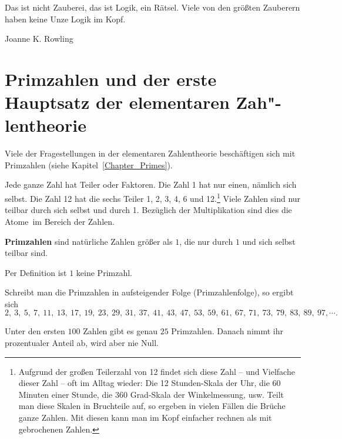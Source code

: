 \begin{refsegment}
\begin{ctsquote}
Das ist nicht Zauberei, das ist Logik, ein Rätsel.
Viele von den größten Zauberern haben keine Unze Logik im Kopf.
\caption[Joanne K. Rowling]{Joanne K. Rowling\footnotemark}
\end{ctsquote}
\addtocounter{footnote}{0}


\section[Primzahlen und der erste Hauptsatz der elementaren Zahlentheorie]
        {Primzahlen und der erste Hauptsatz der elementaren Zah"-lentheorie}
Viele der Fragestellungen in der elementaren Zahlentheorie beschäftigen sich
mit Primzahlen (siehe Kapitel~\ref{Chapter_Primes}).

Jede ganze Zahl hat Teiler oder Faktoren. Die Zahl 1 hat nur einen, nämlich
sich selbst. Die Zahl 12 hat die sechs Teiler 1, 2, 3, 4, 6 und 12.\footnote{%
  Aufgrund der großen Teilerzahl von 12 findet sich diese Zahl -- und Vielfache
  dieser Zahl -- oft im Alltag wieder:
  Die 12 Stunden-Skala der Uhr, die 60 Minuten einer Stunde, die 360 Grad-Skala
  der Winkelmessung, usw. Teilt man diese Skalen in Bruchteile auf, so ergeben
  in vielen Fällen die Brüche ganze Zahlen. Mit diesen kann
  man im Kopf einfacher rechnen als mit gebrochenen Zahlen.
}
Viele Zahlen sind nur teilbar durch sich selbst und durch 1. Bezüglich der
Multiplikation sind dies die \glqq Atome\grqq~im Bereich der Zahlen.

\begin{definition}\label{def-zth-prime}
\textbf{Primzahlen} sind natürliche Zahlen größer als $1$, die nur durch $1$ und sich
selbst teilbar sind.
\end{definition}

Per Definition ist $1$ keine Primzahl.

Schreibt man die Primzahlen in aufsteigender Folge (Primzahlenfolge), so
ergibt sich
$$2,~ 3,~ 5,~ 7,~ 11, ~13,~ 17,~ 19, ~23, ~29, ~31, ~37,~ 41,~ 43,~ 47,~ 53, ~59, ~61, ~67, ~71,
~73, ~79, ~83, ~89, ~97, \cdots.$$

Unter den ersten $100$ Zahlen gibt es genau $25$ Primzahlen. Danach nimmt ihr
prozentualer Anteil ab, wird aber nie Null.


\end{refsegment}
